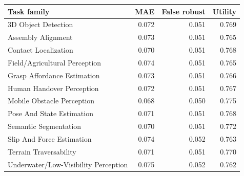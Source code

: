 \begin{tabular}{lrrr}
\toprule
Task family & MAE & False robust & Utility \\
\midrule
3D Object Detection & 0.072 & 0.051 & 0.769 \\
Assembly Alignment & 0.073 & 0.051 & 0.765 \\
Contact Localization & 0.070 & 0.051 & 0.768 \\
Field/Agricultural Perception & 0.074 & 0.051 & 0.765 \\
Grasp Affordance Estimation & 0.073 & 0.051 & 0.766 \\
Human Handover Perception & 0.072 & 0.051 & 0.767 \\
Mobile Obstacle Perception & 0.068 & 0.050 & 0.775 \\
Pose And State Estimation & 0.071 & 0.051 & 0.768 \\
Semantic Segmentation & 0.070 & 0.051 & 0.772 \\
Slip And Force Estimation & 0.074 & 0.052 & 0.763 \\
Terrain Traversability & 0.071 & 0.051 & 0.770 \\
Underwater/Low-Visibility Perception & 0.075 & 0.052 & 0.762 \\
\bottomrule
\end{tabular}
